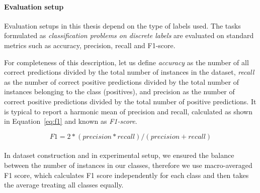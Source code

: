 \label{pg:eval_setup}
\paragraph{Evaluation setup} Evaluation setups in this thesis depend on the type of labels used. 
The tasks formulated as \textit{classification problems on discrete labels} are evaluated on standard metrics such as accuracy, precision, recall and F1-score.


For completeness of this description, let us define \textit{accuracy} as the number of all correct predictions divided by the total number of instances in the dataset, \textit{recall} %
as the number of correct positive predictions divided by the total number of instances belonging to the class (positives), and precision %
as the number of correct positive predictions divided by the total number of positive predictions.
It is typical to report a harmonic mean of precision and recall, calculated as shown in Equation~\ref{eq:f1} and known as \textit{F1-score}. %

\begin{equation}\label{eq:f1}
	F1 = 2 * (precision * recall) / (precision + recall)
\end{equation}
\\
In dataset construction and in experimental setup, we ensured the balance between the number of instances in our classes, therefore we use macro-averaged F1 score, which calculates F1 score independently for each class and then takes the average treating all classes equally.

